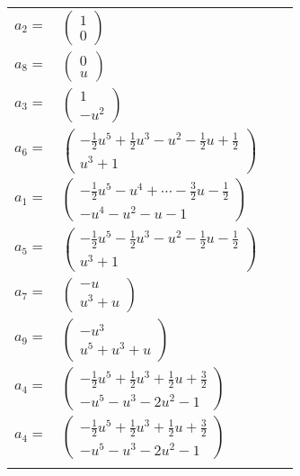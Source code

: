 \documentclass[1p]{elsarticle_modified}
\theoremstyle{definition}
\begin{document}
\begin{tabular}{m{7pt} m{180pt} m{7pt} m{180pt} }
\flushright $a_{2}=$&$\begin{pmatrix}1\\0\end{pmatrix}$ \\
\flushright $a_{8}=$&$\begin{pmatrix}0\\u\end{pmatrix}$ \\
\flushright $a_{3}=$&$\begin{pmatrix}1\\- u^2\end{pmatrix}$ \\
\flushright $a_{6}=$&$\begin{pmatrix}-\frac{1}{2} u^5+\frac{1}{2} u^3- u^2-\frac{1}{2} u+\frac{1}{2}\\u^3+1\end{pmatrix}$ \\
\flushright $a_{1}=$&$\begin{pmatrix}-\frac{1}{2} u^5- u^4+\cdots-\frac{3}{2} u-\frac{1}{2}\\- u^4- u^2- u-1\end{pmatrix}$ \\
\flushright $a_{5}=$&$\begin{pmatrix}-\frac{1}{2} u^5-\frac{1}{2} u^3- u^2-\frac{1}{2} u-\frac{1}{2}\\u^3+1\end{pmatrix}$ \\
\flushright $a_{7}=$&$\begin{pmatrix}- u\\u^3+u\end{pmatrix}$ \\
\flushright $a_{9}=$&$\begin{pmatrix}- u^3\\u^5+u^3+u\end{pmatrix}$ \\
\flushright $a_{4}=$&$\begin{pmatrix}-\frac{1}{2} u^5+\frac{1}{2} u^3+\frac{1}{2} u+\frac{3}{2}\\- u^5- u^3-2 u^2-1\end{pmatrix}$\\ \flushright $a_{4}=$&$\begin{pmatrix}-\frac{1}{2} u^5+\frac{1}{2} u^3+\frac{1}{2} u+\frac{3}{2}\\- u^5- u^3-2 u^2-1\end{pmatrix}$\\&\end{tabular}
\end{document}
